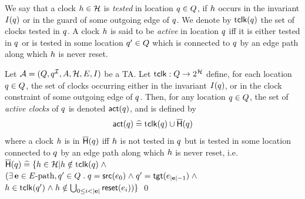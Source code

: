 We say that a clock $\clock \in \clocks$ is \emph{tested} in
location $q \in Q$, if $h$ occurs in the invariant
$I(q)$ or in the guard of some outgoing edge of $q$.
We denote by ${\mathop{\mathrm{t}{\sf clk}}}(q)$ the set of clocks tested in $q$.  A
clock $h$ is said to be \emph{active} in location
$q$ iff it is either tested in $q$ or is tested
in some location $q' \in Q$ which is connected to $q$ by
an edge path along which $h$ is never reset. 
\begin{definition}\label{def:sgactiveclocks}
Let $\AA = (\tglocs,\tgiloc,\Actions,\tgclks,\tgedges,\tginv)$ be a TA.
Let $\tclk : \tglocs \fun 2^\tgclks$ define, for each location $q
\in Q$, the set of clocks occurring either in the invariant 
$I(q)$, or in the clock constraint of some outgoing edge of $q$.
Then, for any location $q \in Q$,
the set of \emph{active clocks} of $q$ is denoted ${\mathop{\sf act}}(q)$, and
is defined by 
\[ {\mathop{\sf act}}(q) \mathrel{\widehat=} {\mathop{\mathrm{t}{\sf clk}}}(q) \cup \mathop{\overline{\sf H}}(q) \] 
where a clock $h$ is in 
$\mathop{\overline{\sf H}}(q)$ iff $h$ is not tested in $q$ but
is tested in some location connected to $q$ by an edge path 
along which $h$ is never reset, i.e. \\
\hspace*{2cm}
$\nreset(\tgloc) \defs \{\clock \in \tgclks | \clock \notin \tclk(\tgloc) 
  \land$ \\
\hspace*{4cm} 
$(\exists \epath \in \Epath, \tgloc' \in \tglocs \such  
\tgloc = \esource(\tgedge_0) \land  
\tgloc' = \etarget(\tgedge_{\length{\epath}-1}) \land$ \\ 
\hspace*{4cm}
$h \in {\mathop{\mathrm{t}{\sf clk}}}(q') \mathrel{\wedge} 
h \notin \bigcup_{0 \leq i < {\left|{\bf e}\right|}} \mathop{\sf reset}(e_i))\}$
\qed
\end{definition}

